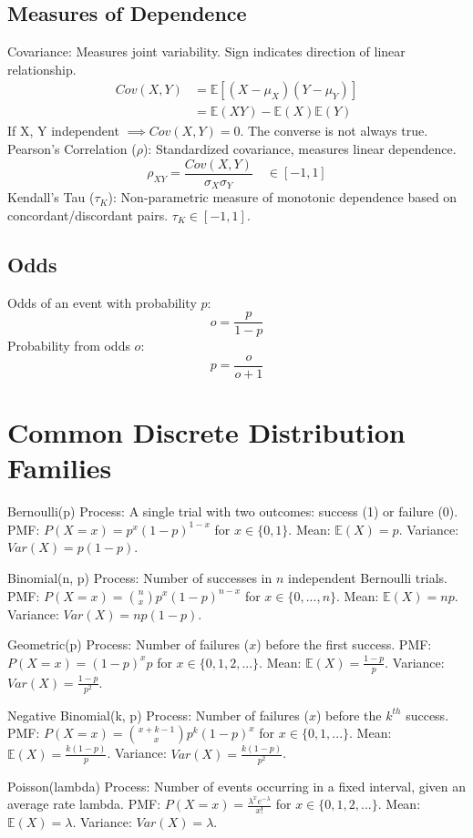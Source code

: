 \documentclass[8pt]{article}
\begin{document}
\begin{multicols}{3}
\subsection*{Measures of Dependence}
Covariance: Measures joint variability. Sign indicates direction of linear relationship.
\begin{align*}
Cov(X,Y) &= \mathbb{E}[(X-\mu_X)(Y-\mu_Y)] \\
         &= \mathbb{E}(XY) - \mathbb{E}(X)\mathbb{E}(Y)
\end{align*}
If X, Y independent $\implies Cov(X,Y) = 0$. The converse is not always true.
Pearson’s Correlation ($\rho$): Standardized covariance, measures linear dependence.
$$\rho_{XY} = \frac{Cov(X,Y)}{\sigma_X \sigma_Y} \quad \in [-1, 1]$$
Kendall’s Tau ($\tau_K$): Non-parametric measure of monotonic dependence based on concordant/discordant pairs. $\tau_K \in [-1, 1]$.
\subsection*{Odds}
Odds of an event with probability $p$:
$$o = \frac{p}{1-p}$$
Probability from odds $o$:
$$p = \frac{o}{o+1}$$
\section*{Common Discrete Distribution Families}
\begin{distbox}{Bernoulli(p)}
Process: A single trial with two outcomes: success (1) or failure (0).
PMF: $P(X=x) = p^x(1-p)^{1-x}$ for $x \in \{0, 1\}$.
Mean: $\mathbb{E}(X) = p$.
Variance: $Var(X) = p(1-p)$.
\end{distbox}
\begin{distbox}{Binomial(n, p)}
Process: Number of successes in $n$ independent Bernoulli trials.
PMF: $P(X=x) = \binom{n}{x}p^x(1-p)^{n-x}$ for $x \in \{0, ..., n\}$.
Mean: $\mathbb{E}(X) = np$.
Variance: $Var(X) = np(1-p)$.
\end{distbox}
\begin{distbox}{Geometric(p)}
Process: Number of failures ($x$) before the first success.
PMF: $P(X=x) = (1-p)^x p$ for $x \in \{0, 1, 2, ...\}$.
Mean: $\mathbb{E}(X) = \frac{1-p}{p}$.
Variance: $Var(X) = \frac{1-p}{p^2}$.
\end{distbox}
\begin{distbox}{Negative Binomial(k, p)}
Process: Number of failures ($x$) before the $k^{th}$ success.
PMF: $P(X=x) = \binom{x+k-1}{x}p^k(1-p)^x$ for $x \in \{0, 1, ...\}$.
Mean: $\mathbb{E}(X) = \frac{k(1-p)}{p}$.
Variance: $Var(X) = \frac{k(1-p)}{p^2}$.
\end{distbox}
\begin{distbox}{Poisson(lambda)}
Process: Number of events occurring in a fixed interval, given an average rate lambda.
PMF: $P(X=x) = \frac{\lambda^x e^{-\lambda}}{x!}$ for $x \in \{0, 1, 2, ...\}$.
Mean: $\mathbb{E}(X) = \lambda$.
Variance: $Var(X) = \lambda$.
\end{distbox}
\end{multicols}
\end{document}
